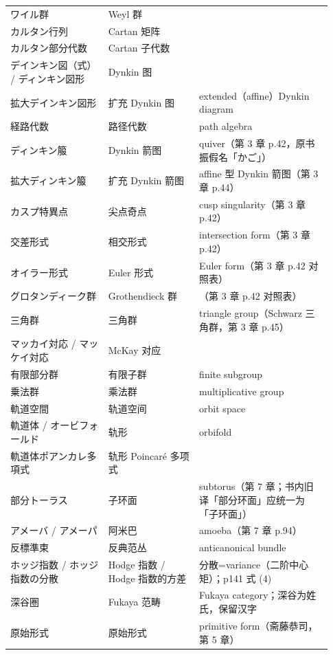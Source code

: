 \begin{longtable}{@{}>{\raggedright\arraybackslash}p{0.29\linewidth}>{\raggedright\arraybackslash}p{0.26\linewidth}>{\raggedright\arraybackslash}p{0.38\linewidth}@{}}
ワイル群 & Weyl \mbox{群} &  \\
カルタン行列 & Cartan \mbox{矩阵} &  \\
カルタン部分代数 & Cartan \mbox{子代数} &  \\
デインキン図（式） / ディンキン図形 & Dynkin \mbox{图} &  \\
拡大デインキン図形 & \mbox{扩充} Dynkin \mbox{图} & extended（affine）Dynkin diagram \\
経路代数 & \mbox{路径代数} & path algebra \\
ディンキン箙 & Dynkin \mbox{箭图} & quiver（第 3 章 p.42，原书振假名「かご」） \\
拡大ディンキン箙 & \mbox{扩充} Dynkin \mbox{箭图} & affine 型 Dynkin 箭图（第 3 章 p.44） \\
カスプ特異点 & \mbox{尖点奇点} & cusp singularity（第 3 章 p.42） \\
交差形式 & \mbox{相交形式} & intersection form（第 3 章 p.42） \\
オイラー形式 & Euler \mbox{形式} & Euler form（第 3 章 p.42 对照表） \\
グロタンディーク群 & Grothendieck \mbox{群} & （第 3 章 p.42 对照表） \\
三角群 & \mbox{三角群} & triangle group（Schwarz 三角群，第 3 章 p.45） \\
マッカイ対応 / マッケイ対応 & McKay \mbox{对应} &  \\
有限部分群 & \mbox{有限子群} & finite subgroup \\
乗法群 & \mbox{乘法群} & multiplicative group \\
軌道空間 & \mbox{轨道空间} & orbit space \\
軌道体 / オービフォールド & \mbox{轨形} & orbifold \\
軌道体ポアンカレ多項式 & \mbox{轨形} Poincaré \mbox{多项式} &  \\
部分トーラス & \mbox{子环面} & subtorus（第 7 章；书内旧译「部分环面」应统一为「子环面」） \\
アメーバ / アメーパ & \mbox{阿米巴} & amoeba（第 7 章 p.94） \\
反標準束 & \mbox{反典范丛} & anticanonical bundle \\
ホッジ指数 / ホッジ指数の分散 & Hodge \mbox{指数} / Hodge \mbox{指数的方差} & 分散=variance（二阶中心矩）；p141 式 (4) \\
深谷圏 & Fukaya \mbox{范畴} & Fukaya category；深谷为姓氏，保留汉字 \\
原始形式 & \mbox{原始形式} & primitive form（斋藤恭司，第 5 章） \\

\end{longtable}

